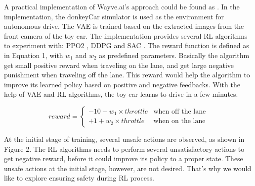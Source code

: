 \documentclass{article} %
\begin{document}
A practical implementation of Wayve.ai's approach \cite{kendall2018learning} could be found as \cite{drive-smoothly-in-minutes}. In the implementation, the donkeyCar simulator \cite{donkeyCar-simulator} is used as the environment for autonomous drive. The VAE is trained based on the extracted images from the front camera of the toy car. The implementation provides several RL algorithms to experiment with: PPO2 \cite{schulman2017proximal}, DDPG \cite{lillicrap2015continuous} and SAC \cite{haarnoja2018soft}. The reward function is defined as in Equation 1, with $w_1$ and $w_2$ as predefined parameters. Basically the algorithm get small positive reward when traveling on the lane, and get large negative punishment when traveling off the lane. This reward would help the algorithm to improve its learned policy based on positive and negative feedbacks. With the help of VAE and RL algorithms, the toy car learns to drive in a few minutes.

\begin{equation}
reward = \begin{cases}
          -10 - w_1 \times throttle &\text{when off the lane}\\
          +1 + w_2 \times throttle  &\text{when on the lane}
         \end{cases}
\end{equation}

At the initial stage of training, several unsafe actions are observed, as shown in Figure 2. The RL algorithms needs to perform several unsatisfactory actions to get negative reward, before it could improve its policy to a proper state. These unsafe actions at the initial stage, however, are not desired. That's why we would like to explore ensuring safety during RL process.
\end{document}
